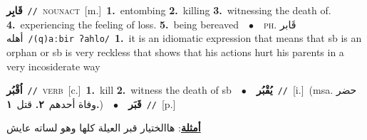 \documentclass[10pt,a4paper,twoside]{article} %
\begin{document}
\begin{multicols}{2}
{{{{\setlength\topsep{0pt}\textbf{\foreignlanguage{arabic}{قَابِر}}\ {\color{gray}\texttt{//}\color{black}}\ \textsc{noun\textunderscore act}\ [m.]\ \textbf{1.}~entombing  \textbf{2.}~killing  \textbf{3.}~witnessing the death of.  \textbf{4.}~experiencing the feeling of loss.  \textbf{5.}~being bereaved\ \ $\bullet$\ \ \textsc{ph.} \color{gray} \foreignlanguage{arabic}{قَابر أهله}\color{black}\ {\color{gray}\texttt{/{\sffamily (q)aːbir ʔahlo}/}\color{black}}\ \textbf{1.}~it is an idiomatic expression that means that sb is an orphan or sb is very reckless that shows that his actions hurt his parents in a very incosiderate way\ 

{\setlength\topsep{0pt}\textbf{\foreignlanguage{arabic}{اُقْبُر}}\ {\color{gray}\texttt{//}\color{black}}\ \textsc{verb}\ [c.]\ \textbf{1.}~kill  \textbf{2.}~witness the death of sb\ \ $\bullet$\ \ \setlength\topsep{0pt}\textbf{\foreignlanguage{arabic}{يُقْبُر}}\ {\color{gray}\texttt{//}\color{black}}\ [i.]\ \color{gray}(msa. \foreignlanguage{arabic}{حضر وفاة أحدهم}~\foreignlanguage{arabic}{\textbf{٢.}}  \foreignlanguage{arabic}{قتل}~\foreignlanguage{arabic}{\textbf{١.}})\color{black}\ \ $\bullet$\ \ \setlength\topsep{0pt}\textbf{\foreignlanguage{arabic}{قَبَر}}\ {\color{gray}\texttt{//}\color{black}}\ [p.]\  \begin{flushright}\color{gray}\foreignlanguage{arabic}{\textbf{\underline{\foreignlanguage{arabic}{أمثلة}}}: هاالختيار قبر العيلة كلها وهو لساته عايش}\end{flushright}\color{black}} \vspace{2mm}

}}}}
\end{multicols}
\end{document}
